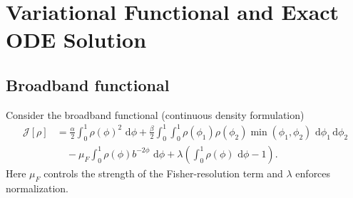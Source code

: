 \documentclass[11pt]{article}
\theoremstyle{plain}
\theoremstyle{definition}
\theoremstyle{remark}
\newcommand{\dd}{\,\mathrm{d}}
\begin{document}
\section{Variational Functional and Exact ODE Solution}

\subsection{Broadband functional}

Consider the broadband functional (continuous density formulation)
\begin{equation}
\begin{aligned}
\mathcal{J}[\rho]
&=\frac{\alpha}{2}\int_0^1\rho(\phi)^2\,\dd\phi
 +\frac{\beta}{2}\int_0^1\!\!\int_0^1\rho(\phi_1)\rho(\phi_2)\min(\phi_1,\phi_2)\,\dd\phi_1\dd\phi_2\\
&\quad-\mu_F\int_0^1\rho(\phi)b^{-2\phi}\,\dd\phi
 +\lambda\!\left(\int_0^1\rho(\phi)\,\dd\phi-1\right).
\end{aligned}
\label{eq:broadband_functional}
\end{equation}
Here $\mu_F$ controls the strength of the Fisher-resolution term and $\lambda$ enforces
normalization.
\end{document}
